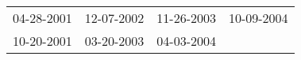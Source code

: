\begin{supertabular}{llll}
 04-28-2001 &  12-07-2002 &  11-26-2003 &  10-09-2004 \\
 10-20-2001 &  03-20-2003 &  04-03-2004 &             \\
\end{supertabular}
